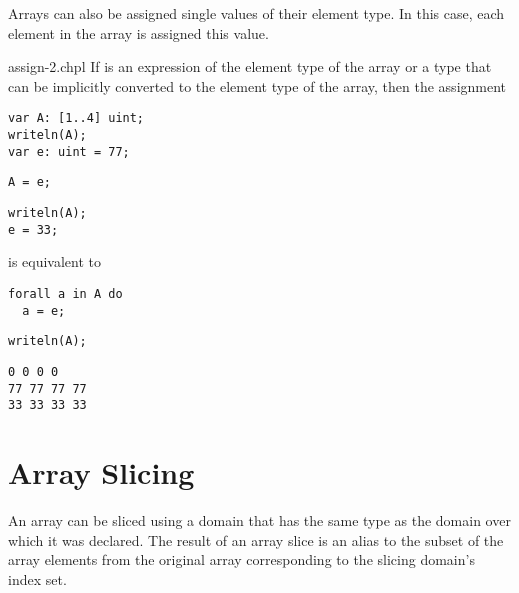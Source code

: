 
Arrays can also be assigned single values of their element type.  In
this case, each element in the array is assigned this value.
\begin{chapelexample}{assign-2.chpl}
If  is an expression of the element type of the array or a
type that can be implicitly converted to the element type of the
array, then the assignment
\begin{chapelpre}
\begin{verbatim}
var A: [1..4] uint;
writeln(A);
var e: uint = 77;
\end{verbatim}
\end{chapelpre}
\begin{chapel}
\begin{verbatim}
A = e;
\end{verbatim}
\end{chapel}
\begin{chapelnoprint}
\begin{verbatim}
writeln(A);
e = 33;
\end{verbatim}
\end{chapelnoprint}
is equivalent to
\begin{chapel}
\begin{verbatim}
forall a in A do
  a = e;
\end{verbatim}
\end{chapel}
\begin{chapelpost}
\begin{verbatim}
writeln(A);
\end{verbatim}
\end{chapelpost}
\begin{chapeloutput}
\begin{verbatim}
0 0 0 0
77 77 77 77
33 33 33 33
\end{verbatim}
\end{chapeloutput}
\end{chapelexample}

\section{Array Slicing}
\label{Array_Slicing}

An array can be sliced using a domain that has the same type as the
domain over which it was declared.  The result of an array slice is an
alias to the subset of the array elements from the original array
corresponding to the slicing domain's index set.
 
